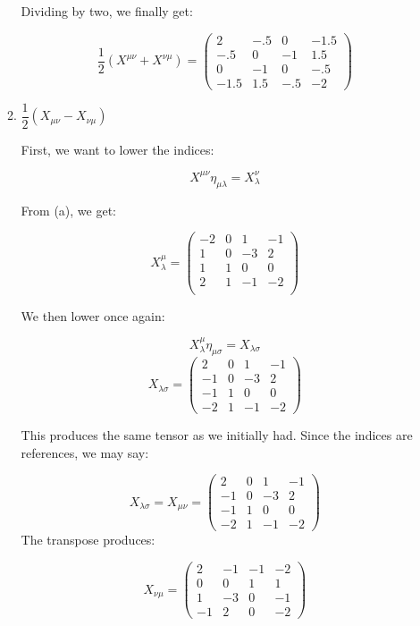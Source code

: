 \begin{enumerate}
\begin{enumerate}
        Dividing by two, we finally get:

        $$\boxed{\frac{1}{2}\left(X^{\mu\nu}+X^{\nu\mu}\right)=\left( \begin{matrix} 2 & -.5 & 0 & -1.5\\ -.5 & 0 & -1 & 1.5\\ 0 & -1 & 0 & -.5\\ -1.5 & 1.5 & -.5 & -2 \end{matrix}\right)}$$

      \item $\dfrac{1}{2}\left( X_{\mu\nu}-X_{\nu\mu} \right)$

        First, we want to lower the indices:

        $$X^{\mu\nu}\eta_{\mu\lambda}=X^{\nu}_{\lambda}$$

        From (a), we get: 

        $$X_{\lambda}^{\mu}=\left( \begin{matrix} -2 & 0 & 1 & -1 \\ 1 & 0 & -3 & 2\\ 1 & 1 & 0 & 0\\ 2 & 1 & -1 & -2\\ \end{matrix}\right)$$

        We then lower once again:

        $$X_{\lambda}^{\mu}\eta_{\mu\sigma}=X_{\lambda\sigma}$$
        $$X_{\lambda\sigma}=\left( \begin{matrix} 2 & 0 & 1 & -1 \\ -1 & 0 & -3 & 2\\ -1 & 1 & 0 & 0\\ -2 & 1 & -1 & -2 \end{matrix} \right)$$

        This produces the same tensor as we initially had. Since the indices are references, we may say:

        $$X_{\lambda\sigma}=X_{\mu\nu}=\left( \begin{matrix} 2 & 0 & 1 & -1 \\ -1 & 0 & -3 & 2\\ -1 & 1 & 0 & 0\\ -2 & 1 & -1 & -2 \end{matrix} \right)$$
        The transpose produces:

        $$X_{\nu\mu}=\left( \begin{matrix} 2 & -1 & -1 & -2\\ 0 & 0 & 1 & 1 \\ 1 & -3 & 0 & -1\\ -1 & 2 & 0 & -2\end{matrix} \right)$$


\end{enumerate}
\end{enumerate}
